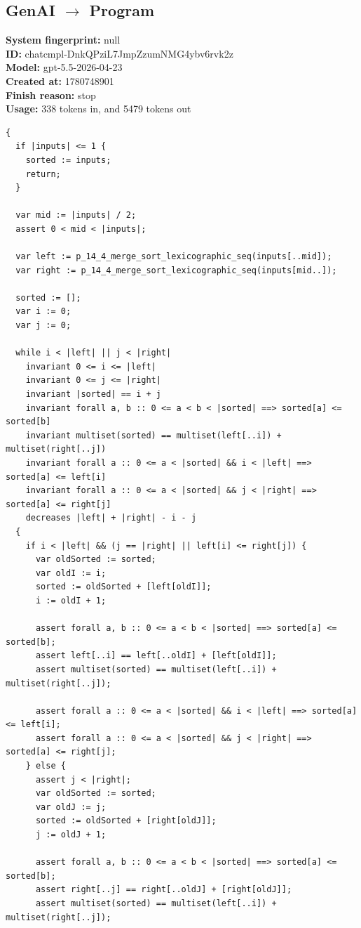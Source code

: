 \documentclass{article}
\begin{document}
\subsection*{GenAI $\rightarrow$ Program}
\textbf{System fingerprint: }null
\\\textbf{ID: }chatcmpl-DnkQPziL7JmpZzumNMG4ybv6rvk2z
\\\textbf{Model: }gpt-5.5-2026-04-23
\\\textbf{Created at: }1780748901
\\\textbf{Finish reason: }stop
\\\textbf{Usage: }338 tokens in, and 5479 tokens out
\begin{lstlisting}
{
  if |inputs| <= 1 {
    sorted := inputs;
    return;
  }

  var mid := |inputs| / 2;
  assert 0 < mid < |inputs|;

  var left := p_14_4_merge_sort_lexicographic_seq(inputs[..mid]);
  var right := p_14_4_merge_sort_lexicographic_seq(inputs[mid..]);

  sorted := [];
  var i := 0;
  var j := 0;

  while i < |left| || j < |right|
    invariant 0 <= i <= |left|
    invariant 0 <= j <= |right|
    invariant |sorted| == i + j
    invariant forall a, b :: 0 <= a < b < |sorted| ==> sorted[a] <= sorted[b]
    invariant multiset(sorted) == multiset(left[..i]) + multiset(right[..j])
    invariant forall a :: 0 <= a < |sorted| && i < |left| ==> sorted[a] <= left[i]
    invariant forall a :: 0 <= a < |sorted| && j < |right| ==> sorted[a] <= right[j]
    decreases |left| + |right| - i - j
  {
    if i < |left| && (j == |right| || left[i] <= right[j]) {
      var oldSorted := sorted;
      var oldI := i;
      sorted := oldSorted + [left[oldI]];
      i := oldI + 1;

      assert forall a, b :: 0 <= a < b < |sorted| ==> sorted[a] <= sorted[b];
      assert left[..i] == left[..oldI] + [left[oldI]];
      assert multiset(sorted) == multiset(left[..i]) + multiset(right[..j]);

      assert forall a :: 0 <= a < |sorted| && i < |left| ==> sorted[a] <= left[i];
      assert forall a :: 0 <= a < |sorted| && j < |right| ==> sorted[a] <= right[j];
    } else {
      assert j < |right|;
      var oldSorted := sorted;
      var oldJ := j;
      sorted := oldSorted + [right[oldJ]];
      j := oldJ + 1;

      assert forall a, b :: 0 <= a < b < |sorted| ==> sorted[a] <= sorted[b];
      assert right[..j] == right[..oldJ] + [right[oldJ]];
      assert multiset(sorted) == multiset(left[..i]) + multiset(right[..j]);


\end{lstlisting}
\end{document}
